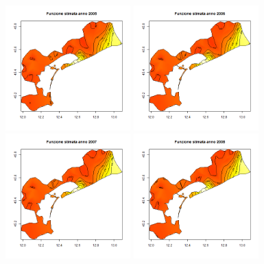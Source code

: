 \documentclass[a4paper,11pt,twoside,openright]{book}							%
\begin{document}
\newpage
\begin{figure}[H]
	\centering
	\includegraphics[width=0.43\textwidth ,height=0.235\textheight]{Immagini/venezia_senza_covariate/Anno2005.png}
	\includegraphics[width=0.43\textwidth ,height=0.235\textheight]{Immagini/venezia_senza_covariate/Anno2006.png}
	\includegraphics[width=0.43\textwidth ,height=0.235\textheight]{Immagini/venezia_senza_covariate/Anno2007.png}
	\includegraphics[width=0.43\textwidth ,height=0.235\textheight]{Immagini/venezia_senza_covariate/Anno2008.png}

\end{figure}
\end{document}
